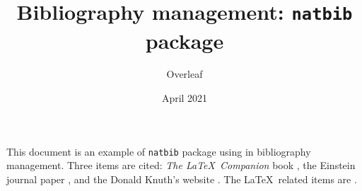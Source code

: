 \documentclass{cukproposal}
\title{Bibliography management: \texttt{natbib} package}
\author{Overleaf}
\date {April 2021}
\begin{document}
\maketitle

This document is an example of \texttt{natbib} package using in bibliography
management. Three items are cited: \textit{The \LaTeX\ Companion} book 
\cite{latexcompanion}, the Einstein journal paper \cite{einstein}, and the 
Donald Knuth's website \cite{knuthwebsite}. The \LaTeX\ related items are 
\cite{latexcompanion,knuthwebsite}. \\
\citeauthor{latexcompanion}

\medskip


\end{document}

